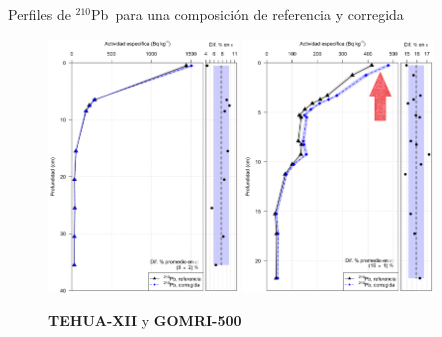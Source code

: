 \documentclass[9pt]{beamer}
\newcommand{\PbCero}{$^{210}$Pb}
\begin{document}
\begin{frame}{Perfiles de \PbCero\, para una composición de referencia y corregida}
	\begin{figure}
		\centering
		\includegraphics[width=0.45\textwidth]{Imagenes/Act_210Pb_Agua_Composicion_TEHUA-XII.png}
		\includegraphics[width=0.45\textwidth]{Imagenes/Act_210Pb_Agua_Composicion_GOMRI_500-2.png}
		\caption{ \textbf{TEHUA-XII} y \textbf{GOMRI-500}}
	\end{figure}
\end{frame}
\end{document}
